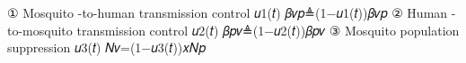 ① Mosquito -to-human transmission control  𝑢1(𝑡) 𝛽𝑣𝑝≜(1−𝑢1(𝑡))𝛽𝑣𝑝
② Human -to-mosquito transmission control  𝑢2(𝑡) 𝛽𝑝𝑣≜(1−𝑢2(𝑡))𝛽𝑝𝑣
③ Mosquito population suppression  𝑢3(𝑡) 𝑁𝑣=(1−𝑢3(𝑡))𝑥𝑁𝑝